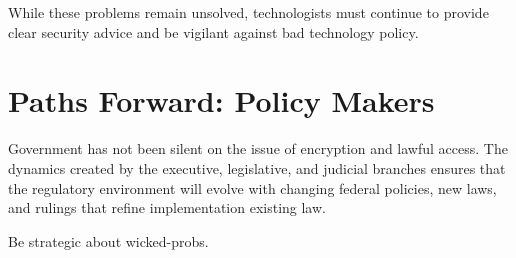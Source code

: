 While these problems remain unsolved, technologists must continue to provide clear security advice and be vigilant
against bad technology policy.


\section{Paths Forward: Policy Makers}

Government has not been silent on the issue of encryption and lawful access. The dynamics created by the executive,
legislative, and judicial branches ensures that the regulatory environment will evolve with changing federal policies,
new laws, and rulings that refine implementation existing law.

Be strategic about \acp{wicked-prob}.


\taskstart


\taskend









